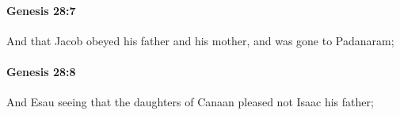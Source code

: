 		\paragraph{Genesis 28:7} %
			\label{GENESIS-28-7}

			And that Jacob obeyed his father and his mother, and was gone to Padanaram;


		\paragraph{Genesis 28:8} %
			\label{GENESIS-28-8}

			And Esau seeing that the daughters of Canaan pleased not Isaac his father;


